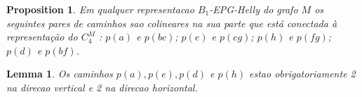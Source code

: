 \documentclass[a4paper,11pt]{article}
\newtheorem{lema}[theorem]{Lemma}
\newtheorem{prop}[theorem]{Proposition}
\begin{document}
\begin{prop}
Em qualquer representacao $B_{1}$-EPG-Helly do grafo $M$ os seguintes pares de caminhos sao colineares na sua parte que está conectada à representação do $C_4^M$ : $p(a)$ e $p(bc)$; $p(e)$ e $p(cg)$; $p(h)$ e $p(fg)$; $p(d)$ e $p(bf)$.
\end{prop}

\begin{lema}
Os caminhos $p(a), p(e), p(d)$ e $p(h)$ estao obrigatoriamente 2 na direcao vertical e 2 na direcao horizontal.
\end{lema}



%






%
\end{document}
